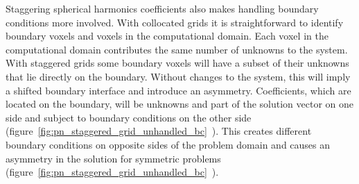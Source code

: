Staggering spherical harmonics coefficients also makes handling boundary conditions more involved. With collocated grids it is straightforward to identify boundary voxels and voxels in the computational domain. Each voxel in the computational domain contributes the same number of unknowns to the system. With staggered grids some boundary voxels will have a subset of their unknowns that lie directly on the boundary. Without changes to the system, this will imply a shifted boundary interface and introduce an asymmetry. Coefficients, which are located on the boundary, will be unknowns and part of the solution vector on one side and subject to boundary conditions on the other side (figure~\ref{fig:pn_staggered_grid_unhandled_bc}~). This creates different boundary conditions on opposite sides of the problem domain and causes an asymmetry in the solution for symmetric problems (figure~\ref{fig:pn_staggered_grid_unhandled_bc}~).
